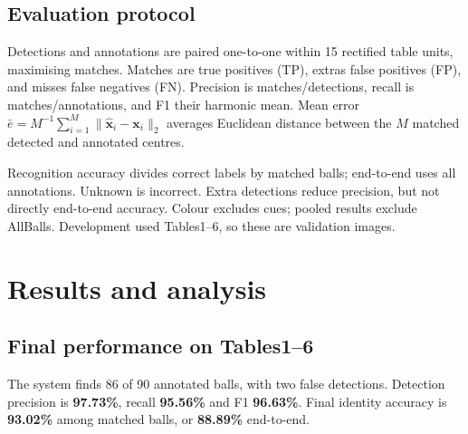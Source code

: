 \documentclass[12pt,a4paper]{article}
\begin{document}
\subsection{Evaluation protocol}

Detections and annotations are paired one-to-one within 15 rectified table units,
maximising matches. Matches are true positives (TP), extras false positives (FP),
and misses false negatives (FN). Precision is matches/detections, recall is
matches/annotations, and F1 their harmonic mean. Mean error
$\bar e=M^{-1}\sum_{i=1}^{M}\|\hat{\mathbf x}_i-\mathbf x_i\|_2$ averages Euclidean
distance between the $M$ matched detected and annotated centres.


Recognition accuracy divides correct labels by matched balls; end-to-end uses all
annotations. Unknown is incorrect. Extra detections reduce precision, but not
directly end-to-end accuracy. Colour excludes cues; pooled results exclude
AllBalls. Development used Tables1--6, so these are validation images.
\newpage

\section{Results and analysis}
\subsection{Final performance on Tables1--6}
The system finds 86 of 90 annotated balls, with two false detections.
Detection precision is \textbf{97.73\%}, recall \textbf{95.56\%} and F1
\textbf{96.63\%}. Final identity accuracy is \textbf{93.02\%} among matched balls,
or \textbf{88.89\%} end-to-end.

\end{document}
